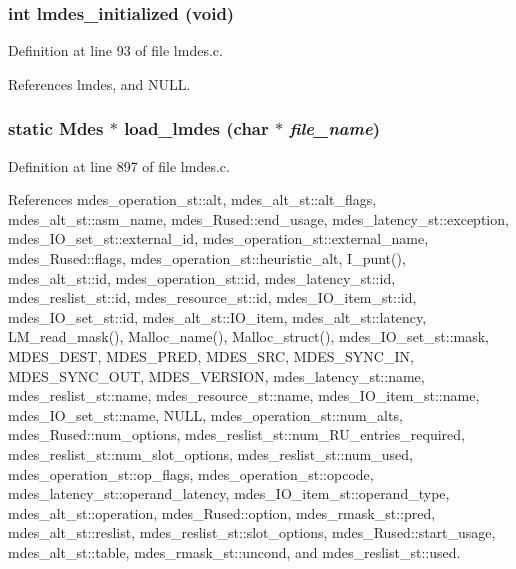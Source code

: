 \subsubsection{\setlength{\rightskip}{0pt plus 5cm}int lmdes\_\-initialized (void)}\label{lmdes_8c_8036561f663279103ef2f7065b02f1dd}




Definition at line 93 of file lmdes.c.

References lmdes, and NULL.
\subsubsection{\setlength{\rightskip}{0pt plus 5cm}static \bf{Mdes} $\ast$ load\_\-lmdes (char $\ast$ {\em file\_\-name})\hspace{0.3cm}{\tt  [static]}}\label{lmdes_8c_ac8f0578ba8e0385eaa000abb0afc134}




Definition at line 897 of file lmdes.c.

References mdes\_\-operation\_\-st::alt, mdes\_\-alt\_\-st::alt\_\-flags, mdes\_\-alt\_\-st::asm\_\-name, mdes\_\-Rused::end\_\-usage, mdes\_\-latency\_\-st::exception, mdes\_\-IO\_\-set\_\-st::external\_\-id, mdes\_\-operation\_\-st::external\_\-name, mdes\_\-Rused::flags, mdes\_\-operation\_\-st::heuristic\_\-alt, I\_\-punt(), mdes\_\-alt\_\-st::id, mdes\_\-operation\_\-st::id, mdes\_\-latency\_\-st::id, mdes\_\-reslist\_\-st::id, mdes\_\-resource\_\-st::id, mdes\_\-IO\_\-item\_\-st::id, mdes\_\-IO\_\-set\_\-st::id, mdes\_\-alt\_\-st::IO\_\-item, mdes\_\-alt\_\-st::latency, LM\_\-read\_\-mask(), Malloc\_\-name(), Malloc\_\-struct(), mdes\_\-IO\_\-set\_\-st::mask, MDES\_\-DEST, MDES\_\-PRED, MDES\_\-SRC, MDES\_\-SYNC\_\-IN, MDES\_\-SYNC\_\-OUT, MDES\_\-VERSION, mdes\_\-latency\_\-st::name, mdes\_\-reslist\_\-st::name, mdes\_\-resource\_\-st::name, mdes\_\-IO\_\-item\_\-st::name, mdes\_\-IO\_\-set\_\-st::name, NULL, mdes\_\-operation\_\-st::num\_\-alts, mdes\_\-Rused::num\_\-options, mdes\_\-reslist\_\-st::num\_\-RU\_\-entries\_\-required, mdes\_\-reslist\_\-st::num\_\-slot\_\-options, mdes\_\-reslist\_\-st::num\_\-used, mdes\_\-operation\_\-st::op\_\-flags, mdes\_\-operation\_\-st::opcode, mdes\_\-latency\_\-st::operand\_\-latency, mdes\_\-IO\_\-item\_\-st::operand\_\-type, mdes\_\-alt\_\-st::operation, mdes\_\-Rused::option, mdes\_\-rmask\_\-st::pred, mdes\_\-alt\_\-st::reslist, mdes\_\-reslist\_\-st::slot\_\-options, mdes\_\-Rused::start\_\-usage, mdes\_\-alt\_\-st::table, mdes\_\-rmask\_\-st::uncond, and mdes\_\-reslist\_\-st::used.


